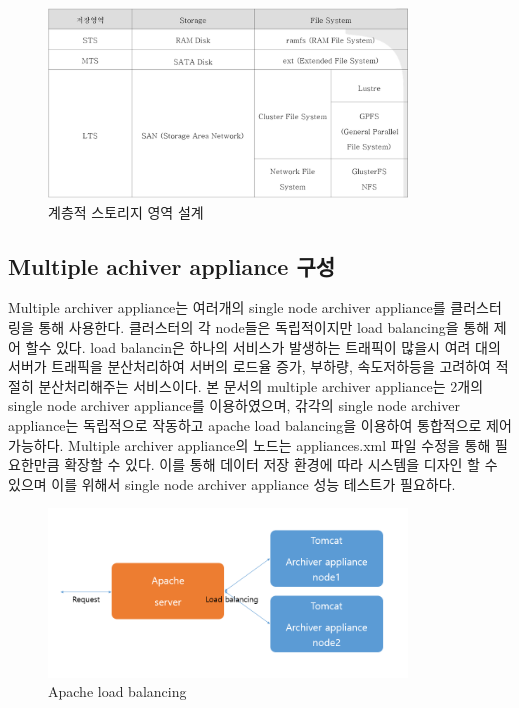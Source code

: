 \documentclass[11pt
  , a4paper
  , article
  , oneside
]{memoir}
\begin{document}
	\begin{figure}[h!]
		\centering
		\includegraphics[width=0.85\textwidth, height=0.3\textheight]{./images/878.png}
		\caption{계층적 스토리지 영역 설계}
	\end{figure}

\subsection{Multiple achiver appliance 구성}
Multiple archiver appliance는 여러개의 single node archiver appliance를 클러스터링을 통해 사용한다. 클러스터의 각 node들은 독립적이지만 load balancing을 통해 제어 할수 있다. load balancin은 하나의 서비스가 발생하는 트래픽이 많을시 여려 대의 서버가 트래픽을 분산처리하여 서버의 로드율 증가, 부하량, 속도저하등을 고려하여 적절히 분산처리해주는 서비스이다. 본 문서의 multiple archiver appliance는 2개의 single node archiver appliance를 이용하였으며, 갂각의 single node archiver appliance는 독립적으로 작동하고 apache load balancing을 이용하여 통합적으로 제어 가능하다. Multiple archiver appliance의 노드는 appliances.xml 파일 수정을 통해 필요한만큼 확장할 수 있다. 이를 통해 데이터 저장 환경에 따라 시스템을 디자인 할 수 있으며 이를 위해서 single node archiver appliance 성능 테스트가 필요하다.

	\begin{figure}[h!]
		\centering
		\includegraphics[width=0.85\textwidth, height=0.4\textwidth]{./images/123.png}
		\caption{Apache load balancing}
	\end{figure}
\end{document}

